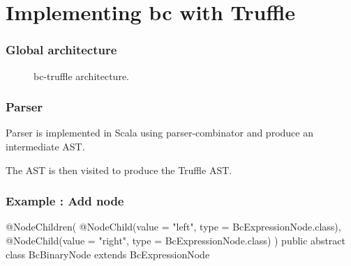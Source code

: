 \documentclass[11pt,handout]{beamer}
\begin{document}





\section[Implementing bc with Truffle]{Implementing bc with Truffle}

\begin{frame}[fragile]
  \frametitle{Global architecture}
  \begin{figure}[ht]
    \centering
    \caption{bc-truffle architecture.}
    \label{fig:bc-truffle-arch}
  \end{figure}
\end{frame}

\begin{frame}[fragile]
  \frametitle{Parser}
  Parser is implemented in Scala using parser-combinator and produce an
  intermediate AST.

  The AST is then visited to produce the Truffle AST.
\end{frame}

\begin{frame}[fragile]
  \frametitle{Example : Add node}
\begin{scalacode}
@NodeChildren({
        @NodeChild(value = "left", type = BcExpressionNode.class),
        @NodeChild(value = "right", type = BcExpressionNode.class)
})
public abstract class BcBinaryNode extends BcExpressionNode {}
\end{scalacode}
\end{frame}
\end{document}
